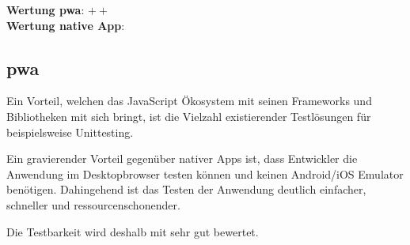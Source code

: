 \textbf{Wertung \ac{pwa}}: $++$\\
\textbf{Wertung native App}:  \\

\subsection{\ac{pwa}}
Ein Vorteil, welchen das JavaScript Ökosystem mit seinen Frameworks und Bibliotheken mit sich bringt, ist die Vielzahl existierender Testlösungen für beispielsweise Unittesting.

Ein gravierender Vorteil gegenüber nativer Apps ist, dass Entwickler die Anwendung im Desktopbrowser testen können und keinen Android/iOS Emulator benötigen. Dahingehend ist das Testen der Anwendung deutlich einfacher, schneller und ressourcenschonender.

Die Testbarkeit wird deshalb mit sehr gut bewertet.